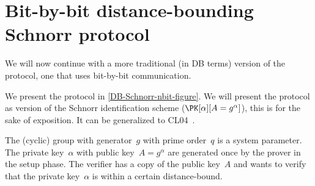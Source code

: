 \section{Bit-by-bit distance-bounding Schnorr protocol}%
\label{DB-Schnorr-nbit}

We will now continue with a more traditional (in \ac{DB} terms) version of the 
protocol, one that uses bit-by-bit communication.


We present the protocol in \cref{DB-Schnorr-nbit-figure}.
We will present the protocol as  version of the Schnorr identification 
scheme (\(\PK[\alpha][A = g^\alpha]\)), this is for the sake of exposition.
It can be generalized to \eg CL04~\cite{CLsignatures}.

The (cyclic) group with generator~\(g\) with prime order~\(q\) is a system 
parameter.
The private key~\(\alpha\) with public key~\(A = g^\alpha\) are generated once 
by the prover in the setup phase.
The verifier has a copy of the public key~\(A\) and wants to verify that the 
private key~\(\alpha\) is within a certain distance-bound.

